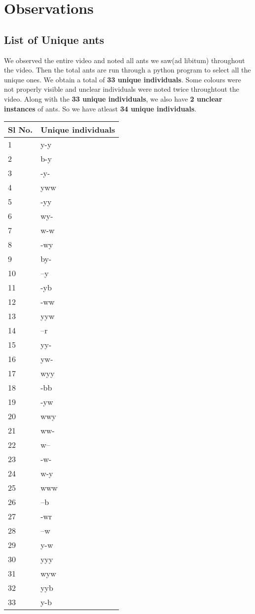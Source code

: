 \documentclass{scrartcl}
\begin{document}
\section{Observations}
\subsection{List of Unique ants}
We observed the entire video and noted all ants we saw(ad libitum) throughout the video. Then the 
total ants are run through a python program to select all the unique ones. We obtain a total of
\textbf{33 unique individuals}. Some colours were not properly visible and unclear individuals were noted 
twice throughtout the video. Along with the \textbf{33 unique individuals}, we also have \textbf{2 unclear instances}
 of ants. So we have atleast \textbf{34 unique individuals}.
\begin{table}[H]
        \centering
\begin{tabular}{|p{0.75in}|p{1.25in}|}
\hline 
 Sl No. & Unique individuals \\
\hline 
 1 & y-y \\
\hline 
 2 & b-y \\
\hline 
 3 & -y- \\
\hline 
 4 & yww \\
\hline 
 5 & -yy \\
\hline 
 6 & wy- \\
\hline 
 7 & w-w \\
\hline 
 8 & -wy \\
\hline 
 9 & by- \\
\hline 
 10 & --y \\
\hline 
 11 & -yb \\
\hline 
 12 & -ww \\
\hline 
 13 & yyw \\
\hline 
 14 & --r \\
\hline 
 15 & yy- \\
\hline 
 16 & yw- \\
\hline 
 17 & wyy \\
\hline 
 18 & -bb \\
\hline 
 19 & -yw \\
\hline 
 20 & wwy \\
\hline 
 21 & ww- \\
\hline 
 22 & w-- \\
\hline 
 23 & -w- \\
\hline 
 24 & w-y \\
\hline 
 25 & www \\
\hline 
 26 & --b \\
\hline 
 27 & -wr \\
\hline 
 28 & --w \\
\hline 
 29 & y-w \\
\hline 
 30 & yyy \\
\hline 
 31 & wyw \\
\hline 
 32 & yyb \\
\hline 
 33 & y-b \\
 \hline
\end{tabular}
\end{table}
\end{document}
